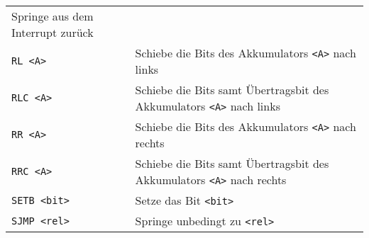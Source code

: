 \begin{longtable}[c]{@{}ll@{}}
\begin{minipage}[t]{0.69\columnwidth}
Springe aus dem Interrupt zurück
\strut\end{minipage}\tabularnewline
\begin{minipage}[t]{0.25\columnwidth}\raggedright\strut
\texttt{RL <A>}
\strut\end{minipage} & \begin{minipage}[t]{0.69\columnwidth}\raggedright\strut
Schiebe die Bits des Akkumulators \texttt{<A>} nach links
\strut\end{minipage}\tabularnewline
\begin{minipage}[t]{0.25\columnwidth}\raggedright\strut
\texttt{RLC <A>}
\strut\end{minipage} & \begin{minipage}[t]{0.69\columnwidth}\raggedright\strut
Schiebe die Bits samt Übertragsbit des Akkumulators \texttt{<A>} nach links
\strut\end{minipage}\tabularnewline
\begin{minipage}[t]{0.25\columnwidth}\raggedright\strut
\texttt{RR <A>}
\strut\end{minipage} & \begin{minipage}[t]{0.69\columnwidth}\raggedright\strut
Schiebe die Bits des Akkumulators \texttt{<A>} nach rechts
\strut\end{minipage}\tabularnewline
\begin{minipage}[t]{0.25\columnwidth}\raggedright\strut
\texttt{RRC <A>}
\strut\end{minipage} & \begin{minipage}[t]{0.69\columnwidth}\raggedright\strut
Schiebe die Bits samt Übertragsbit des Akkumulators \texttt{<A>} nach rechts
\strut\end{minipage}\tabularnewline
\begin{minipage}[t]{0.25\columnwidth}\raggedright\strut
\texttt{SETB <bit>}
\strut\end{minipage} & \begin{minipage}[t]{0.69\columnwidth}\raggedright\strut
Setze das Bit \texttt{<bit>}
\strut\end{minipage}\tabularnewline
\begin{minipage}[t]{0.25\columnwidth}\raggedright\strut
\texttt{SJMP <rel>}
\strut\end{minipage} & \begin{minipage}[t]{0.69\columnwidth}\raggedright\strut
Springe unbedingt zu \texttt{<rel>}
\strut\end{minipage}\tabularnewline

\end{longtable}
